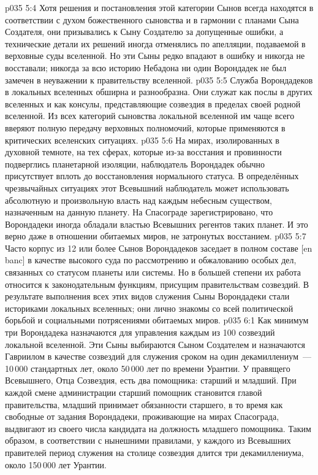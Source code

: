 \vs p035 5:4 Хотя решения и постановления этой категории Сынов всегда находятся в соответствии с духом божественного сыновства и в гармонии с планами Сына Создателя, они призывались к Сыну Создателю за допущенные ошибки, а технические детали их решений иногда отменялись по апелляции, подаваемой в верховные суды вселенной. Но эти Сыны редко впадают в ошибку и никогда не восставали; никогда за всю историю Небадона ни один Ворондадек не был замечен в неуважении к правительству вселенной.
\vs p035 5:5 Служба Ворондадеков в локальных вселенных обширна и разнообразна. Они служат как послы в других вселенных и как консулы, представляющие созвездия в пределах своей родной вселенной. Из всех категорий сыновства локальной вселенной им чаще всего вверяют полную передачу верховных полномочий, которые применяются в критических вселенских ситуациях.
\vs p035 5:6 На мирах, изолированных в духовной темноте, на тех сферах, которые из\hyp{}за восстания и провинности подверглись планетарной изоляции, наблюдатель Ворондадек обычно присутствует вплоть до восстановления нормального статуса. В определённых чрезвычайных ситуациях этот Всевышний наблюдатель может использовать абсолютную и произвольную власть над каждым небесным существом, назначенным на данную планету. На Спасограде зарегистрировано, что Ворондадеки иногда обладали властью Всевышних регентов таких планет. И это верно даже в отношении обитаемых миров, не затронутых восстанием.
\vs p035 5:7 Часто корпус из 12 или более Сынов Ворондадеков заседает в полном составе [en banc] в качестве высокого суда по рассмотрению и обжалованию особых дел, связанных со статусом планеты или системы. Но в большей степени их работа относится к законодательным функциям, присущим правительствам созвездий. В результате выполнения всех этих видов служения Сыны Ворондадеки стали историками локальных вселенных; они лично знакомы со всей политической борьбой и социальными потрясениями обитаемых миров.
\vs p035 6:1 Как минимум три Ворондадека назначаются для управления каждым из 100 созвездий локальной вселенной. Эти Сыны выбираются Сыном Создателем и назначаются Гавриилом в качестве  созвездий для служения сроком на один декамиллениум~--- 10\,000 стандартных лет, около 50\,000 лет по времени Урантии. У правящего Всевышнего, Отца Созвездия, есть два помощника: старший и младший. При каждой смене администрации старший помощник становится главой правительства, младший принимает обязанности старшего, в то время как свободные от задания Ворондадеки, проживающие на мирах Спасограда, выдвигают из своего числа кандидата на должность младшего помощника. Таким образом, в соответствии с нынешними правилами, у каждого из Всевышних правителей период служения на столице созвездия длится три декамиллениума, около 150\,000 лет Урантии.
